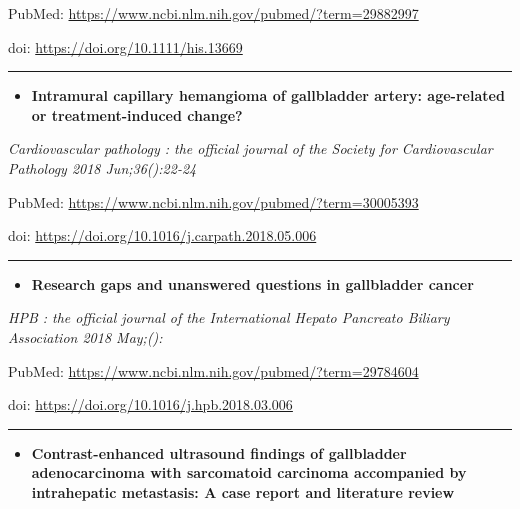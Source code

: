 \documentclass[]{article}
\providecommand{\tightlist}{%
  \setlength{\itemsep}{0pt}\setlength{\parskip}{0pt}}
\begin{document}
PubMed: \url{https://www.ncbi.nlm.nih.gov/pubmed/?term=29882997}

doi: \url{https://doi.org/10.1111/his.13669}

{}

{}

\begin{center}\rule{0.5\linewidth}{\linethickness}\end{center}

\begin{itemize}
\tightlist
\item
  \textbf{Intramural capillary hemangioma of gallbladder artery:
  age-related or treatment-induced change?}
\end{itemize}

\emph{Cardiovascular pathology : the official journal of the Society for
Cardiovascular Pathology 2018 Jun;36():22-24}

PubMed: \url{https://www.ncbi.nlm.nih.gov/pubmed/?term=30005393}

doi: \url{https://doi.org/10.1016/j.carpath.2018.05.006}

{}

{}

\begin{center}\rule{0.5\linewidth}{\linethickness}\end{center}

\begin{itemize}
\tightlist
\item
  \textbf{Research gaps and unanswered questions in gallbladder cancer}
\end{itemize}

\emph{HPB : the official journal of the International Hepato Pancreato
Biliary Association 2018 May;():}

PubMed: \url{https://www.ncbi.nlm.nih.gov/pubmed/?term=29784604}

doi: \url{https://doi.org/10.1016/j.hpb.2018.03.006}

{}

{}

\begin{center}\rule{0.5\linewidth}{\linethickness}\end{center}

\begin{itemize}
\tightlist
\item
  \textbf{Contrast-enhanced ultrasound findings of gallbladder
  adenocarcinoma with sarcomatoid carcinoma accompanied by intrahepatic
  metastasis: A case report and literature review}
\end{itemize}
\end{document}
